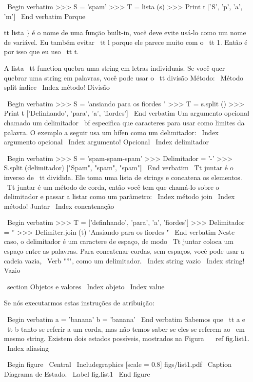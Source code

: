 \documentclass[10pt]{book}
\begin{document}
{{{{{{\ Begin {verbatim}
>>> S = 'spam'
>>> T = lista (s)
>>> Print t
['S', 'p', 'a', 'm']
\ End {verbatim}
%
Porque {tt lista \} é o nome de uma função built-in, você deve
evite usá-lo como um nome de variável. Eu também evitar {\ tt l} porque
ele parece muito com o {\ tt 1}. Então é por isso que eu uso {\ tt t}.

A lista {\ tt} function quebra uma string em letras individuais. Se
você quer quebrar uma string em palavras, você pode usar o {\ tt divisão}
Método:
\ {Método split} índice
\ Index {método! Divisão}

\ Begin {verbatim}
>>> S = 'ansiando para os fiordes "
>>> T = s.split ()
>>> Print t
['Definhando', 'para', 'a', 'fiordes']
\ End {verbatim}
%
Um argumento opcional chamado um delimitador {\ bf} especifica que
caracteres para usar como limites da palavra.
O exemplo a seguir
usa um hífen como um delimitador:
\ Index {argumento opcional}
\ Index {argumento! Opcional}
\ Index {delimitador}

\ Begin {verbatim}
>>> S = 'spam-spam-spam'
>>> Delimitador = '-'
>>> S.split (delimitador)
["Spam", "spam", "spam"]
\ End {verbatim}
%
{\ Tt juntar} é o inverso de {\ tt dividida}. Ele
toma uma lista de strings e
concatena os elementos. {\ Tt juntar} é um método de corda,
então você tem que chamá-lo sobre o delimitador e passar a
listar como um parâmetro:
\ Index {método join}
\ Index {método! Juntar}
\ Index {concatenação}

\ Begin {verbatim}
>>> T = ['definhando', 'para', 'a', 'fiordes']
>>> Delimitador = ''
>>> Delimiter.join (t)
'Ansiando para os fiordes "
\ End {verbatim}
%
Neste caso, o delimitador é um caractere de espaço, de modo
{\ Tt juntar} coloca um espaço entre as palavras. Para concatenar
cordas, sem espaços, você pode usar a cadeia vazia,
\ Verb "''", como um delimitador. 
\ Index {string vazio}
\ Index {string! Vazio}


\ section {Objetos e valores}
\ Index {objeto}
\ Index {value}

Se nós executarmos estas instruções de atribuição:

\ Begin {verbatim}
a = 'banana'
b = 'banana'
\ End {verbatim}
%
Sabemos que {\ tt a} e {\ tt b} tanto se referir a um
corda, mas não temos
saber se eles se referem ao {\ em mesmo} string.
Existem dois estados possíveis, mostrados na Figura ~ \ ref {fig.list1}.
\ Index {aliasing}

\ Begin {figure}
\ Central
{\ Includegraphics [scale = 0.8] {figs/list1.pdf}}
\ Caption {Diagrama de Estado.}
\ Label {} fig.list1
\ End {figure}


}}}}}}}
\end{document}

